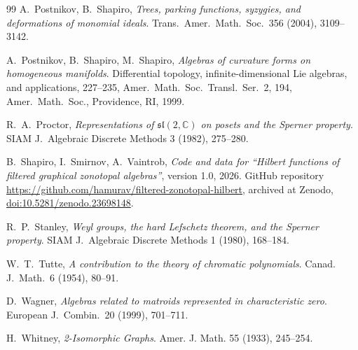 \documentclass[reqno]{article}
\theoremstyle{plain} %
\theoremstyle{definition}
\theoremstyle{remark}
\numberwithin{equation}{section}
\begin{document}
\begin{thebibliography}{99}
 A.~Postnikov, B.~Shapiro, \emph{Trees, parking functions,   syzygies, and deformations of monomial ideals}.
  Trans.\ Amer.\ Math.\ Soc.\ 356 (2004),  3109--3142.

A.~Postnikov,  B.~Shapiro, M.~Shapiro, \emph{Algebras of
  curvature forms on homogeneous manifolds}.
  Differential topology, infinite-dimensional Lie algebras, and applications,
  227--235, Amer.\ Math.\ Soc.\ Transl.\ Ser.\ 2, 194, Amer.\
  Math.\ Soc., Providence, RI, 1999.

 R.~A.~Proctor, \emph{Representations of $\mathfrak{sl}(2,\mathbb C)$ on posets and the Sperner property}. SIAM J.\ Algebraic Discrete Methods 3 (1982), 275--280.

 B.~Shapiro, I.~Smirnov, A.~Vaintrob, \emph{Code and data for ``Hilbert functions of filtered graphical zonotopal algebras''}, version 1.0, 2026. GitHub repository \url{https://github.com/hamurav/filtered-zonotopal-hilbert}, archived at Zenodo, \href{https://doi.org/10.5281/zenodo.23698148}{doi:10.5281/zenodo.23698148}.

 R.~P.~Stanley, \emph{Weyl groups, the hard Lefschetz theorem, and the Sperner property}. SIAM J.\ Algebraic Discrete Methods 1 (1980), 168--184.

 W.~T.~Tutte, \emph{A contribution to the theory of chromatic polynomials}. Canad. J.\ Math.\ 6 (1954), 80--91.

 D.~Wagner,  \emph{Algebras related to matroids represented in
  characteristic zero}.  European J.\ Combin.\ 20 (1999), 701--711.

 H.~Whitney, \emph{2-Isomorphic Graphs}.
Amer. J. Math. 55 (1933), 245--254.

\end{thebibliography}
\end{document}
